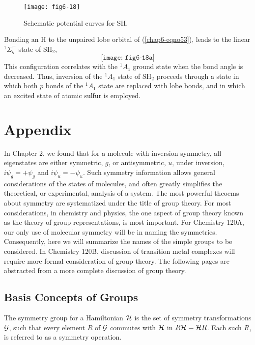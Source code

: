 \begin{figure}
\texttt{[image: fig6-18]}
\caption{Schematic potential curves for SH.}
\label{chap6-fig19}
\end{figure}

Bonding an H to the unpaired lobe orbital of (\ref{chap6-eqno53}),
leads to the linear ${^1\Sigma}^+_g$ state of SH$_2$,
\begin{equation}
\texttt{[image: fig6-18a]}
\end{equation}
This configuration correlates with the ${^1A}_1$ ground state when the bond 
angle is decreased.  Thus, inversion of the ${^1A}_1$ state of SH$_2$ proceeds 
through a state in which both $p$ bonds of the ${^1A}_1$ state are replaced 
with lobe bonds, and in which an excited state of atomic sulfur is employed.


\section{Appendix}

In Chapter 2, we found that for a molecule with inversion symmetry, 
all eigenstates are either symmetric, $g$, or antisymmetric, $u$, 
under inversion, $i \psi_g = + \psi_g$ and $i \psi_u = - \psi_u$.  
Such symmetry information allows general considerations of the states 
of molecules, and often greatly simplifies the theoretical, or 
experimental, analysis of a 
system.  The most powerful theoems about symmetry are systematized 
under the title of group theory.  For most considerations, in 
chemistry and physics, the one aspect of group theory known as the 
theory of group representations, is most important.  For Chemistry 
120A, our only use of molecular symmetry will be in naming the 
symmetries.  Consequently, here we will summarize the names of the 
simple groups to be considered.  In Chemistry 120B, discussion of 
transition metal complexes will require more formal consideration of 
group theory.  The following pages are abstracted from a more complete 
discussion of group theory.

\subsection{Basis Concepts of Groups}

The symmetry group for a Hamiltonian ${\cal H}$ is the set of symmetry 
transformations ${\cal G}$, such that every element $R$ of ${\cal G}$ 
commutes with ${\cal H}$ in $R {\cal H} = {\cal H}R$.  Each such $R$, 
is referred to as a symmetry operation.

